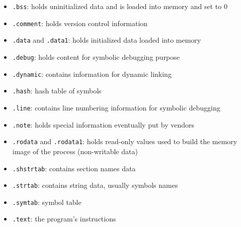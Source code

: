 \begin{itemize}
	\item \texttt{.bss}: holds uninitialized data and is loaded into memory and set to 0
	\item \texttt{.comment}: holds version control information
	\item \texttt{.data} and \texttt{.data1}: holds initialized data loaded into memory
	\item \texttt{.debug}: holds content for symbolic debugging purpose
	\item \texttt{.dynamic}: contains information for dynamic linking
	\item \texttt{.hash}: hash table of symbols
	\item \texttt{.line}: contains line numbering information for symbolic debugging
	\item \texttt{.note}: holds special information eventually put by vendors 
	\item \texttt{.rodata} and \texttt{.rodata1}: holds read-only values used to build the memory image of the process (non-writable data)
	\item \texttt{.shstrtab}: contains section names data
	\item \texttt{.strtab}: contains string data, usually symbols names
	\item \texttt{.symtab}: symbol table
	\item \texttt{.text}: the program's instructions
\end{itemize}
